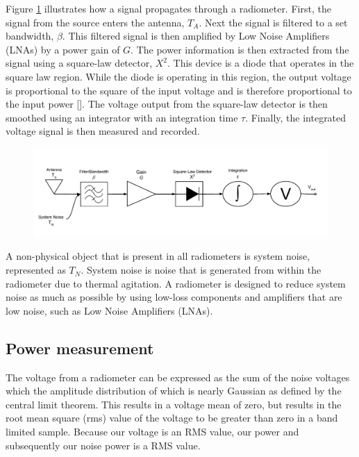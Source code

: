 Figure \ref{trad_radiometer} illustrates how a signal propagates through a radiometer.  First, the signal from the source enters the antenna, $T_A$.  Next the signal is filtered to a set bandwidth, $\beta$.  This filtered signal is then amplified by Low Noise Amplifiers (LNAs) by a power gain of $G$.  The power information is then extracted from the signal using a square-law detector, $X^2$.  This device is a diode that operates in the square law region.  While the diode is operating in this region, the output voltage is proportional to the square of the input voltage and is therefore proportional to the input power [\cite{Leinweber}].  The voltage output from the square-law detector is then smoothed using an integrator with an integration time $\tau$.  Finally, the integrated voltage signal is then measured and recorded.

{\begin{figure}[h!tb] 
\centering
\includegraphics[width=\textwidth]{Images/Traditional_Radiometer.pdf}
\label{trad_radiometer}
\end{figure}
}

A non-physical object that is present in all radiometers is system noise, represented as $T_{N}$.  System noise is noise that is generated from within the radiometer due to thermal agitation.  A radiometer is designed to reduce system noise as much as possible by using low-loss components and amplifiers that are low noise, such as Low Noise Amplifiers (LNAs). 

\subsection{Power measurement}\label{pwr_measurement}
The voltage from a radiometer can be expressed as the sum of the noise voltages which the amplitude distribution of which is nearly Gaussian as defined by the central limit theorem.  This results in a voltage mean of zero, but results in the root mean square (rms) value of the voltage to be greater than zero in a band limited sample.  Because our voltage is an RMS value, our power and subsequently our noise power is a RMS value.

